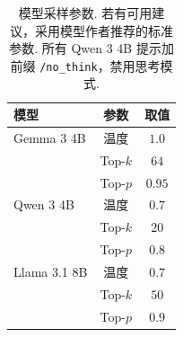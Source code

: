 \begin{longtable}{lcc}
\caption{模型采样参数. 若有可用建议，采用模型作者推荐的标准参数. 所有 Qwen 3 4B 提示加前缀 \texttt{/no\_think}，禁用思考模式.}\label{cat-tab:samplingparams}\\

        \toprule
        模型 & 参数 & 取值 \\
        \midrule
        Gemma 3 4B & 温度 & $1.0$ \\
        & Top-$k$ & $64$ \\
        & Top-$p$ & $0.95$ \\
        \midrule
        Qwen 3 4B & 温度 & $0.7$ \\
        & Top-$k$ & $20$ \\
        & Top-$p$ & $0.8$ \\
        \midrule
        Llama 3.1 8B & 温度 & $0.7$ \\
        & Top-$k$ & $50$ \\
        & Top-$p$ & $0.9$ \\
        \bottomrule
    
\end{longtable}
